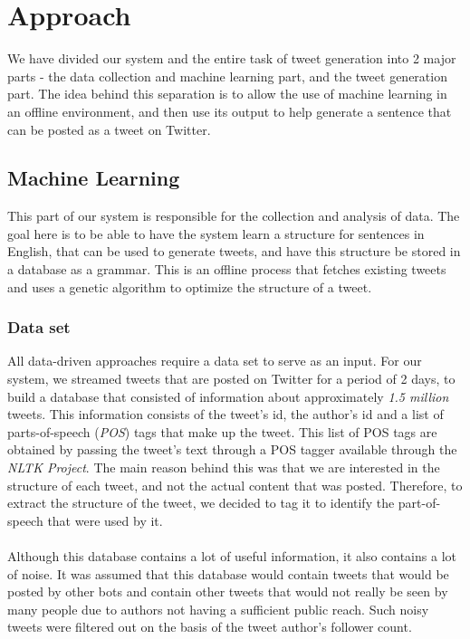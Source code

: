\section{Approach}
We have divided our system and the entire task of tweet generation into 2 major parts - the data collection and machine learning part, and the tweet generation part. The idea behind this separation is to allow the use of machine learning in an offline environment, and then use its output to help generate a sentence that can be posted as a tweet on Twitter.
\subsection{Machine Learning}
This part of our system is responsible for the collection and analysis of data. The goal here is to be able to have the system learn a structure for sentences in English, that can be used to generate tweets, and have this structure be stored in a database as a grammar. This is an offline process that fetches existing tweets and uses a genetic algorithm to optimize the structure of a tweet.
\subsubsection{Data set}
All data-driven approaches require a data set to serve as an input. For our system, we streamed tweets that are posted on Twitter for a period of 2 days, to build a database that consisted of information about approximately \textit{1.5 million} tweets. This information consists of the tweet's id, the author's id and a list of parts-of-speech (\textit{POS}) tags that make up the tweet. This list of POS tags are obtained by passing the tweet's text through a POS tagger available through the \textit{NLTK Project}. The main reason behind this was that we are interested in the structure of each tweet, and not the actual content that was posted. Therefore, to extract the structure of the tweet, we decided to tag it to identify the part-of-speech that were used by it. 
\paragraph{}
Although this database contains a lot of useful information, it also contains a lot of noise. It was assumed that this database would contain tweets that would be posted by other bots and contain other tweets that would not really be seen by many people due to authors not having a sufficient public reach. Such noisy tweets were filtered out on the basis of the tweet author's follower count.
